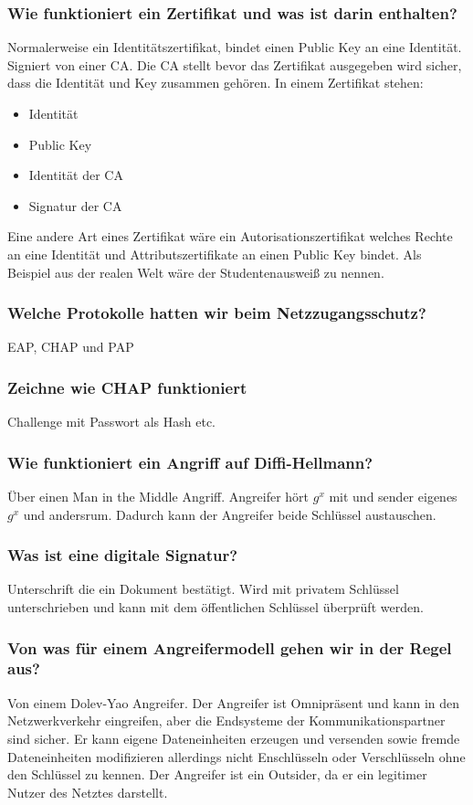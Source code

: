 	\subsubsection{Wie funktioniert ein Zertifikat und was ist darin enthalten?}
	Normalerweise ein Identitätszertifikat, bindet einen Public Key an eine Identität. Signiert von einer CA. Die CA stellt bevor das Zertifikat ausgegeben wird sicher, dass die Identität und Key zusammen gehören.
	In einem Zertifikat stehen: 
	\begin{itemize}
		\item Identität
		\item Public Key
		\item Identität der CA
		\item Signatur der CA
	\end{itemize}	 
	Eine andere Art eines Zertifikat wäre ein Autorisationszertifikat welches Rechte an eine Identität und Attributszertifikate an einen Public Key bindet.
	Als Beispiel aus der realen Welt wäre der Studentenausweiß zu nennen.

	\subsubsection{Welche Protokolle hatten wir beim Netzzugangsschutz?}
	EAP, CHAP und PAP
	
	\subsubsection{Zeichne wie CHAP funktioniert}
	Challenge mit Passwort als Hash etc.	
	
	\subsubsection{Wie funktioniert ein Angriff auf Diffi-Hellmann?}
	Über einen Man in the Middle Angriff. Angreifer hört $g^x$ mit und sender eigenes $g^x$ und andersrum. Dadurch kann der Angreifer beide Schlüssel austauschen.
	
	\subsubsection{Was ist eine digitale Signatur?}
	Unterschrift die ein Dokument bestätigt. Wird mit privatem Schlüssel unterschrieben und kann mit dem öffentlichen Schlüssel überprüft werden.
	
	\subsubsection{Von was für einem Angreifermodell gehen wir in der Regel aus?}
	Von einem Dolev-Yao Angreifer. Der Angreifer ist Omnipräsent und kann in den Netzwerkverkehr eingreifen, aber die Endsysteme der Kommunikationspartner sind sicher. Er kann eigene Dateneinheiten erzeugen und versenden  sowie fremde Dateneinheiten modifizieren allerdings  nicht Enschlüsseln oder Verschlüsseln ohne den Schlüssel zu kennen. Der Angreifer ist ein Outsider, da er ein legitimer Nutzer des Netztes darstellt.
	

